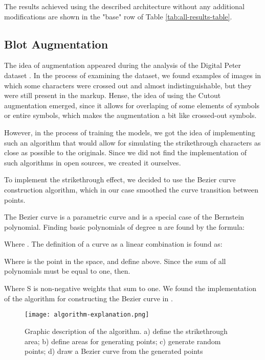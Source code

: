 \documentclass[10pt,twocolumn,letterpaper]{article}
\begin{document}
The results achieved using the described architecture without any additional modifications are shown in the "base" row of Table \ref{tab:all-results-table}. 





\subsection{Blot Augmentation}

The idea of augmentation appeared during the analysis of the Digital Peter dataset \cite{complink,potanin2021digital}. In the process of examining the dataset, we found examples of images in which some characters were crossed out and almost indistinguishable, but they were still present in the markup. Hense, the idea of using the Cutout augmentation \cite{devries2017improved} emerged, since it allows for overlaping of some elements of symbols or entire symbols, which makes the augmentation a bit like crossed-out symbols.






However, in the process of training the models, we got the idea of implementing such an algorithm that would allow for simulating the strikethrough characters as close as possible to the originals. Since we did not find the implementation of such algorithms in open sources, we created it ourselves.

To implement the strikethrough effect, we decided to use the Bezier curve construction algorithm, which in our case smoothed the curve transition between points.

The Bezier curve is a parametric curve and is a special case of the Bernstein polynomial. Finding basic polynomials of degree n are found by the formula:



 Where . The definition of a curve as a linear combination is found as:



Where  is the point in the space, and  define above. Since the sum of all polynomials must be equal to one, then.



Where S is non-negative weights that sum to one. We found the implementation of the algorithm for constructing the Bezier curve in \cite{Hermes2017}.

\begin{figure}[ht]
\begin{center}
   \texttt{[image: algorithm-explanation.png]}
\end{center}
   \caption{Graphic description of the algorithm. a) define the strikethrough area; b) define areas for generating points;  c) generate random points; d) draw a Bezier curve from the generated points}
\label{fig:hwb-algorithm-explanation}
\end{figure}
\end{document}
